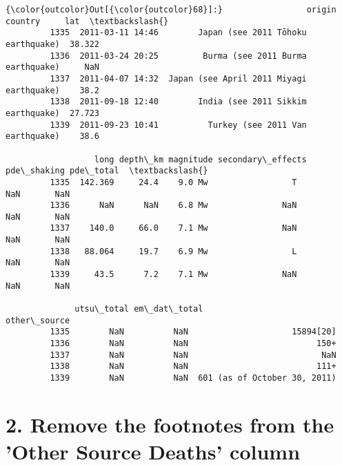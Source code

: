 \documentclass[11pt]{article}
\begin{document}
\begin{Verbatim}[commandchars=\\\{\}]
{\color{outcolor}Out[{\color{outcolor}68}]:}                 origin                                   country     lat  \textbackslash{}
         1335  2011-03-11 14:46        Japan (see 2011 Tōhoku earthquake)  38.322   
         1336  2011-03-24 20:25         Burma (see 2011 Burma earthquake)     NaN   
         1337  2011-04-07 14:32  Japan (see April 2011 Miyagi earthquake)    38.2   
         1338  2011-09-18 12:40        India (see 2011 Sikkim earthquake)  27.723   
         1339  2011-09-23 10:41          Turkey (see 2011 Van earthquake)    38.6   
         
                  long depth\_km magnitude secondary\_effects pde\_shaking pde\_total  \textbackslash{}
         1335  142.369     24.4    9.0 Mw                 T         NaN       NaN   
         1336      NaN      NaN    6.8 Mw               NaN         NaN       NaN   
         1337    140.0     66.0    7.1 Mw               NaN         NaN       NaN   
         1338   88.064     19.7    6.9 Mw                 L         NaN       NaN   
         1339     43.5      7.2    7.1 Mw               NaN         NaN       NaN   
         
              utsu\_total em\_dat\_total                  other\_source  
         1335        NaN          NaN                     15894[20]  
         1336        NaN          NaN                          150+  
         1337        NaN          NaN                           NaN  
         1338        NaN          NaN                          111+  
         1339        NaN          NaN  601 (as of October 30, 2011)  
\end{Verbatim}
            
    \section{2. Remove the footnotes from the 'Other Source Deaths'
column}\label{remove-the-footnotes-from-the-other-source-deaths-column}
\end{document}
